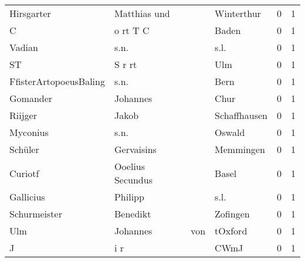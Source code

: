 \begin{tabular}{llllrr}
               Hirsgarter &                       Matthias und &             &                                  Winterthur &          0 &         1 \\
                        C &                           o rt T C &             &                                       Baden &          0 &         1 \\
                   Vadian &                               s.n. &             &                                        s.l. &          0 &         1 \\
                       ST &                             S r rt &             &                                         Ulm &          0 &         1 \\
   FfisterArtopoeusBaling &                               s.n. &             &                                        Bern &          0 &         1 \\
                 Gomander &                           Johannes &             &                                        Chur &          0 &         1 \\
                  Riijger &                              Jakob &             &                                Schaffhausen &          0 &         1 \\
                 Myconius &                               s.n. &             &                                      Oswald &          0 &         1 \\
                  Schüler &                         Gervaisins &             &                                   Memmingen &          0 &         1 \\
                  Curiotf &                   Ooelius Secundus &             &                                       Basel &          0 &         1 \\
                Gallicius &                            Philipp &             &                                        s.l. &          0 &         1 \\
             Schurmeister &                           Benedikt &             &                                    Zofingen &          0 &         1 \\
                      Ulm &                           Johannes &         von &                                     tOxford &          0 &         1 \\
                        J &                                i r &             &                                        CWmJ &          0 &         1 \\

\end{tabular}
